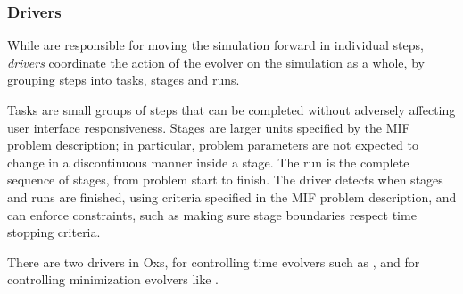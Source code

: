 \subsubsection{Drivers\label{sec:oxsDrivers}}
While  are
responsible for moving the simulation forward in individual steps,
\textit{drivers} coordinate the action of the evolver on the
simulation as a whole, by grouping steps into tasks, stages and runs.

Tasks are small groups of steps that can be completed without adversely
affecting user interface responsiveness.  Stages are larger units
specified by the MIF problem description; in particular, problem
parameters are not expected to change in a discontinuous manner inside a
stage.  The run is the complete sequence of stages, from problem start to
finish.  The driver detects when stages and runs are finished, using
criteria specified in the MIF problem description, and can enforce
constraints, such as making sure stage boundaries respect time stopping
criteria.

There are two drivers in Oxs,
for controlling time evolvers such as
,
and
for controlling minimization evolvers like
.

